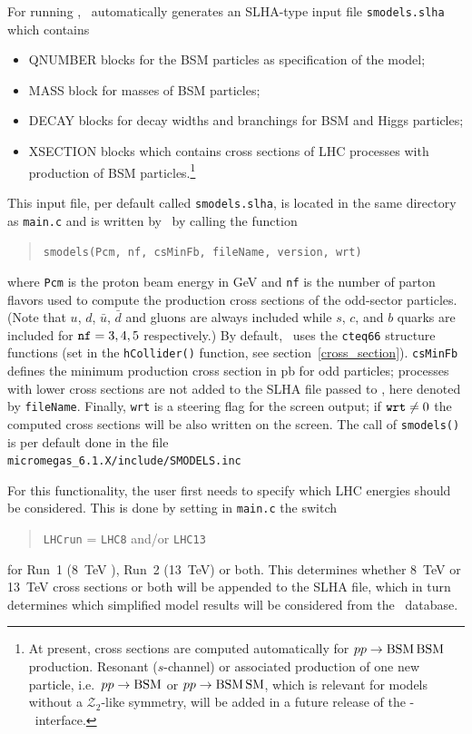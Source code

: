 \documentclass[12pt,a4paper]{article}
\begin{document}
For running \smodels, \micro\ automatically generates  
an SLHA-type input file {\tt smodels.slha} which contains 
\begin{itemize} 
\item  QNUMBER blocks for the BSM particles as specification of the model;
\item  MASS block  for masses of BSM particles; 
\item  DECAY blocks for decay widths and branchings for BSM and Higgs  particles; 
\item  XSECTION  blocks which  contains cross sections of LHC processes with production of BSM particles.\footnote{At present, cross sections are computed automatically for $pp\to {\rm BSM\,BSM}$ production. Resonant ($s$-channel) or associated production of one new particle, i.e.\ $pp\to {\rm BSM}$ or $pp\to {\rm BSM\, SM}$, which is relevant for models without a $\mathcal{Z}_2$-like symmetry, will be added in a future release of the \micro-\smodels\ interface.}  
\end{itemize}  
%
This input file, per default called {\tt smodels.slha}, is located in the same directory as {\tt main.c} and 
is written by \micro\ by calling the function
\begin{quote}
  \verb|smodels(Pcm, nf, csMinFb, fileName, version, wrt)|
\end{quote}  
where \verb|Pcm| is the proton beam energy in GeV and \verb|nf| is the number of parton flavors used to compute the production cross sections of the odd-sector particles. 
(Note that $u$, $d$, $\bar{u}$, $\bar{d}$  and gluons are always included  while  $s$, $c$, and $b$ quarks are included for ${\tt nf} = 3,4,5$ respectively.)
By default, \micro\ uses the \verb|cteq66| \cite{Nadolsky:2008zw} structure functions (set in the \verb|hCollider()| function, see section~\ref{cross_section}). 
{\tt csMinFb} defines the minimum production cross section in pb for odd  particles; processes with lower cross sections are not added to the SLHA file passed to \smodels, here denoted by  {\tt fileName}. 
Finally, {\tt wrt} is a steering flag for the screen output; if ${\tt wrt} \ne 0$  the computed cross sections will be also written on the screen. 
The call of \verb|smodels()| is per default done in the file \\ \verb|micromegas_6.1.X/include/SMODELS.inc| 

For this functionality, the user first needs to specify which LHC energies  should be considered.
This is done by setting in {\tt main.c} the switch
\begin{quote}
    \verb|LHCrun| = \verb|LHC8| and/or \verb|LHC13| 
\end{quote}
for Run~1 (8~TeV ), Run~2 (13~TeV) or both. This determines whether 8~TeV or 13~TeV cross sections or both
will be appended to the SLHA file, which in turn determines which
simplified model results will be considered from the \smodels\
database.
 
\end{document}
